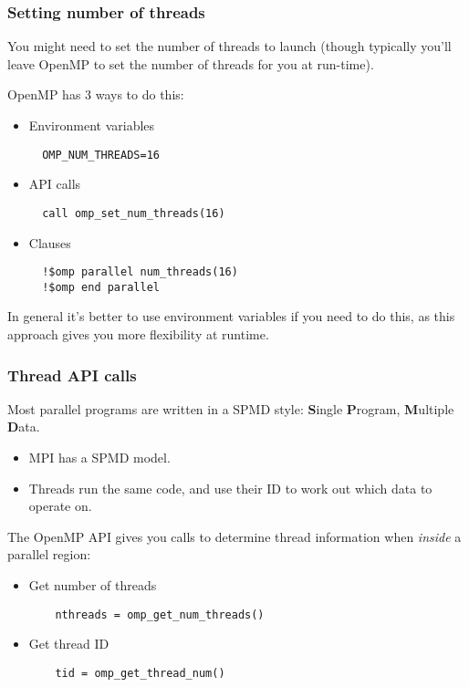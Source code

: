 \documentclass{beamer}
\begin{document}
\begin{frame}[fragile]
\frametitle{Setting number of threads}
You might need to set the number of threads to launch (though typically you'll leave OpenMP to set the number of threads for you at run-time).

OpenMP has 3 ways to do this:
\begin{itemize}
  \item Environment variables
  \begin{verbatim}
  OMP_NUM_THREADS=16
  \end{verbatim}

  \item API calls
  \begin{verbatim}
  call omp_set_num_threads(16)
  \end{verbatim}

  \item Clauses
  \begin{verbatim}
  !$omp parallel num_threads(16)
  !$omp end parallel
  \end{verbatim}
\end{itemize}

In general it's better to use environment variables if you need to do this, as this approach gives you more flexibility at runtime.
\end{frame}

\begin{frame}[fragile]
\frametitle{Thread API calls}
Most parallel programs are written in a SPMD style: \newline
{\bf S}ingle {\bf P}rogram, {\bf M}ultiple {\bf D}ata.
\begin{itemize}
  \item MPI has a SPMD model.
  \item Threads run the same code, and use their ID to work out which data to operate on.
\end{itemize}

The OpenMP API gives you calls to determine thread information when \emph{inside} a parallel region:
\begin{itemize}
  \item Get number of threads
    \begin{verbatim}
    nthreads = omp_get_num_threads()
    \end{verbatim}

  \item Get thread ID
    \begin{verbatim}
    tid = omp_get_thread_num()
    \end{verbatim}

\end{itemize}
\end{frame}
\end{document}
